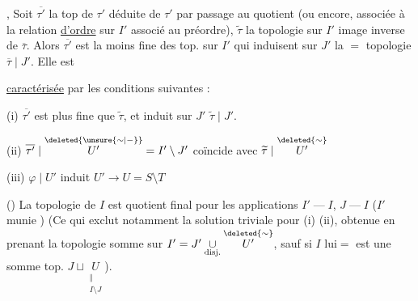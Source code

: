 ,  Soit $\overline{\tau'}$  la top de $\tau'$ déduite de $\tau'$ par passage au quotient (ou encore, associée à la relation \uline{d'ordre} sur $I'$ associé au préordre), $\widetilde{\tau}$ la topologie sur $I'$ image inverse de $\overline{\tau}$. Alors $\overline{\tau'}$ est la moins fine des top. sur $I'$ qui  induisent sur $J'$ la $=$  topologie $\overline{\tau}\mid J'$. Elle est

\uline{caractérisée} par les conditions suivantes :

(i) $\overline{\tau'}$ est plus fine que $\widetilde{\tau}$, et induit sur $J'$ $\widetilde{\tau}\mid J'$.

(ii) $\overline{\tau'}\mid\overset{\deleted{\unsure{\sim|\mathord{-}}}}{U'}=I'\setminus J'$ coïncide avec $\widetilde{\tau}\mid\overset{\deleted{\sim}}{U'}$

(iii) $\varphi\mid U'$ induit   $U'\longrightarrow U=S\setminus T$

() La topologie de $I$ est quotient final pour les applications $I'\mathbin{\text{---}}I$, $J\mathbin{\text{---}}I$ ($I'$ munie  ) (Ce qui exclut notamment la solution triviale pour (i) (ii), obtenue en prenant la topologie somme sur  $I'=J'\underset{\text{disj.}}{\cup}\overset{\deleted{\sim}}{U'}$, sauf si $I$ lui$=$ est une somme top. $J\sqcup\underset{\substack{\Vert\\I\setminus J}}{U}$).

